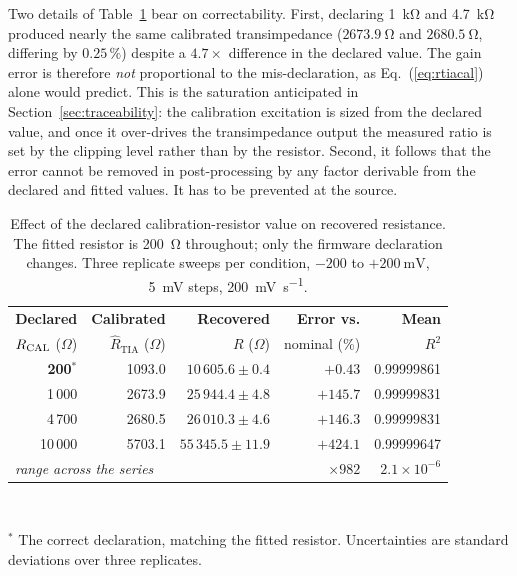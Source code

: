 Two details of Table~\ref{tab:rcal} bear on correctability. First, declaring
\SI{1}{\kilo\ohm} and \SI{4.7}{\kilo\ohm} produced nearly the same calibrated
transimpedance ($\SI{2673.9}{\ohm}$ and $\SI{2680.5}{\ohm}$, differing by
$0.25\,\%$) despite a $4.7\times$ difference in the declared value. The gain
error is therefore \emph{not} proportional to the mis-declaration, as
Eq.~(\ref{eq:rtiacal}) alone would predict. This is the saturation anticipated
in Section~\ref{sec:traceability}: the calibration excitation is sized from the
declared value, and once it over-drives the transimpedance output the measured
ratio is set by the clipping level rather than by the resistor. Second, it
follows that the error cannot be removed in post-processing by any factor
derivable from the declared and fitted values. It has to be prevented at the
source.

\begin{table}[!t]
\caption{Effect of the declared calibration-resistor value on recovered
resistance. The fitted resistor is \SI{200}{\ohm} throughout; only the firmware
declaration changes. Three replicate sweeps per condition,
$-200$ to $+\SI{200}{\milli\volt}$, \SI{5}{\milli\volt} steps,
\SI{200}{\milli\volt\per\second}.}
\label{tab:rcal}
\centering
\footnotesize
\begin{tabular}{r r r r r}
\toprule
\textbf{Declared} & \textbf{Calibrated} & \textbf{Recovered} &
\textbf{Error vs.} & \textbf{Mean} \\
$\Rcal$ ($\Omega$) & $\hat{R}_{\mathrm{TIA}}$ ($\Omega$) & $R$ ($\Omega$) &
nominal (\%) & $R^{2}$ \\
\midrule
\textbf{200}$^{*}$ & 1093.0 & $10\,605.6 \pm 0.4$  & $+0.43$   & 0.99999861 \\
1\,000                & 2673.9 & $25\,944.4 \pm 4.8$  & $+145.7$  & 0.99999831 \\
4\,700                & 2680.5 & $26\,010.3 \pm 4.6$  & $+146.3$  & 0.99999831 \\
10\,000               & 5703.1 & $55\,345.5 \pm 11.9$ & $+424.1$  & 0.99999647 \\
\midrule
\multicolumn{3}{l}{\emph{range across the series}} & $\times 982$ & $2.1\times10^{-6}$ \\
\bottomrule
\end{tabular}
\\[2pt]
\parbox{\linewidth}{\footnotesize $^{*}$ The correct declaration, matching the
fitted resistor. Uncertainties are standard deviations over three replicates.}
\end{table}


